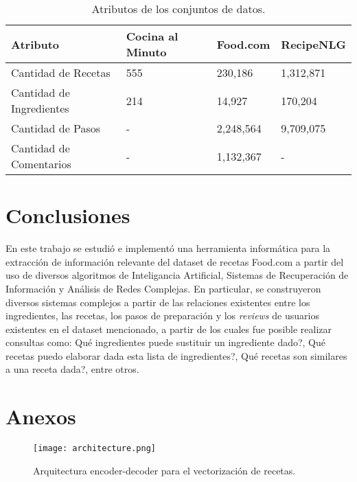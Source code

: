 \documentclass[
	a4paper, %
	10pt, %
	unnumberedsections, %
	twoside, %
]{LTJournalArticle}
\begin{document}
\begin{table*} %
	\caption{Atributos de los conjuntos de datos.}
	\centering
	\begin{tabular}{l l l l}
		\toprule
		Atributo 				 & Cocina al Minuto & Food.com & RecipeNLG  \\
		\midrule
		Cantidad de Recetas 	 & 555				& 230,186	& 1,312,871	\\
		Cantidad de Ingredientes & 214	 			& 14,927	& 170,204	\\
		Cantidad de Pasos 		 & -	 			& 2,248,564	& 9,709,075	\\
		Cantidad de Comentarios  & -	 			& 1,132,367	&	-		\\
		\bottomrule
	\end{tabular}
	\label{tab:data_features}
\end{table*}



\printbibliography %


\section{Conclusiones}

En este trabajo se estudió e implementó una herramienta informática para la extracción de información relevante del dataset de recetas Food.com a partir del uso de diversos algoritmos de Inteligancia Artificial, Sistemas de Recuperación de Información y Análisis de Redes Complejas. En particular, se construyeron diversos sistemas complejos a partir de las relaciones existentes entre los ingredientes, las recetas, los pasos de preparación y los \textit{reviews} de usuarios existentes en el dataset mencionado, a partir de los cuales fue posible realizar consultas como: Qué ingredientes puede sustituir un ingrediente dado?, Qué recetas puedo elaborar dada esta lista de ingredientes?, Qué recetas son similares a una receta dada?, entre otros. 

\section{Anexos}

\begin{figure*}
	\texttt{[image: architecture.png]}
	\caption{Arquitectura encoder-decoder para el vectorización de recetas.}
	\label{fig:encoder_decoder}
\end{figure*}
\end{document}
